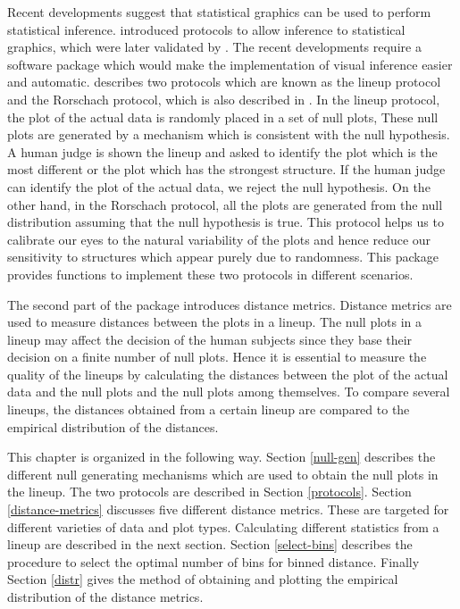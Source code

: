 Recent developments suggest that statistical graphics can be used to perform statistical inference. \cite{buja:2009} introduced protocols to allow inference to statistical graphics, which were later validated by \cite{majumder:2013}. The recent developments require a software package which would make the implementation of visual inference easier and automatic. \cite{buja:2009} describes two protocols which are known as the lineup protocol and the Rorschach protocol, which is also described in \cite{hadley:2010}. In the lineup protocol, the plot of the actual data is randomly placed in a set of null plots, These null plots are generated by a mechanism which is consistent with the null hypothesis. A human judge is shown the lineup and asked to identify the plot which is the most different or the plot which has the strongest structure. If the human judge can identify the plot of the actual data, we reject the null hypothesis. On the other hand, in the Rorschach protocol, all the plots are generated from the null distribution assuming that the null hypothesis is true. This protocol helps us to calibrate our eyes to the natural variability of the plots and hence reduce our sensitivity to structures which appear purely due to randomness. This package provides functions to implement these two protocols in different scenarios. 

The second part of the package introduces distance metrics. Distance metrics are used to measure distances between the plots in a lineup.  The null plots in a lineup may affect the decision of the human subjects since they base their decision on a finite number of null plots. Hence it is essential to measure the quality of the lineups by calculating the distances between the plot of the actual data and the null plots and the null plots among themselves. To compare several lineups, the distances obtained from a certain lineup are compared to the empirical distribution of the distances. 

This chapter is organized in the following way. Section \ref{null-gen} describes the different null generating mechanisms which are used to obtain the null plots in the lineup. The two protocols are described in Section \ref{protocols}. Section \ref{distance-metrics} discusses five different distance metrics. These are targeted for different varieties of data and plot types. Calculating different statistics from a lineup are described in the next section. Section \ref{select-bins} describes the procedure to select the optimal number of bins for binned distance. Finally Section \ref{distr} gives the method of obtaining and plotting the empirical distribution of the distance metrics.


